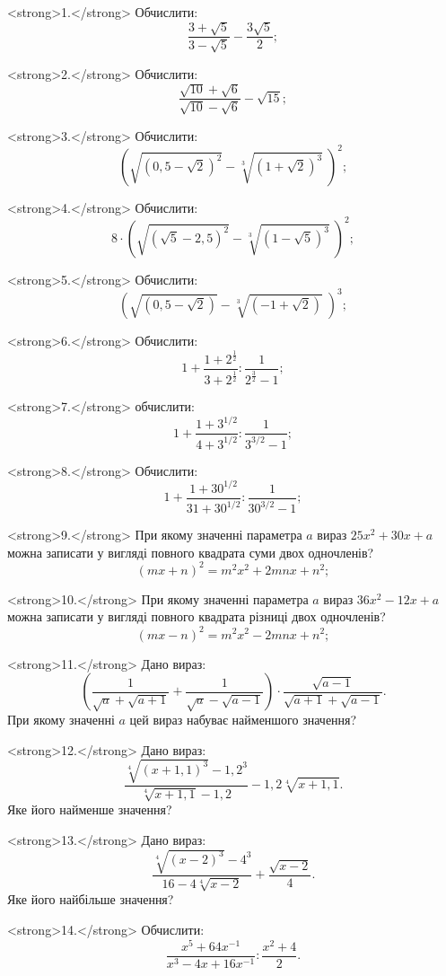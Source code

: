 
<strong>1.</strong> Обчислити:
$$\frac{3+\sqrt{5}}{3-\sqrt{5}}-\frac{3\sqrt{5}}{2};$$

<strong>2.</strong> Обчислити:
$$\frac{\sqrt{10}+\sqrt{6}}{\sqrt{10}-\sqrt{6}} - \sqrt{15};$$

<strong>3.</strong> Обчислити:
$$\left(\sqrt{\left(0,5 - \sqrt{2}\right)^2} - \sqrt[3]{\left(1 + \sqrt{2}\right)^3}\;\right)^2;$$

<strong>4.</strong> Обчислити:
$$8 \cdot \left(\sqrt{\left(\sqrt{5} - 2,5\right)^2} - \sqrt[3]{\left(1 - \sqrt{5}\right)^3}\;\right)^2;$$

<strong>5.</strong> Обчислити:
$$\left(\sqrt{\left(0,5 - \sqrt{2}\right)} - \sqrt[3]{\left(-1 + \sqrt{2}\right)}\;\right)^3;$$

<strong>6.</strong> Обчислити:
$$1 + \frac{1 + 2^\frac{1}{2}}{3 + 2^\frac{1}{2}} : \frac{1}{2^\frac{3}{2} - 1};$$

<strong>7.</strong> обчислити:
$$1 + \frac{1 + 3^{1/2}}{4 + 3^{1/2}} : \frac{1}{3^{3/2} - 1};$$

<strong>8.</strong> Обчислити:
$$1 + \frac{1 + 30^{1/2}}{31 + 30^{1/2}} : \frac{1}{30^{3/2} - 1};$$

<strong>9.</strong> При якому значенні параметра $a$ вираз $25x^2 + 30x + a$ можна записати у вигляді повного квадрата суми двох одночленів?
$$\left(mx + n\right)^2 = m^2x^2 + 2mnx + n^2;$$

<strong>10.</strong> При якому значенні параметра $a$ вираз $36x^2 - 12x + a$ можна записати у вигляді
повного квадрата різниці двох одночленів?
$$\left(mx - n\right)^2 = m^2x^2 - 2mnx + n^2;$$

<strong>11.</strong> Дано вираз:
$$\left(\frac{1}{\sqrt{a} + \sqrt{a + 1}} + \frac{1}{\sqrt{a} - \sqrt{a - 1}}\right) \cdot \frac{\sqrt{a - 1}}{\sqrt{a + 1} + \sqrt{a - 1}}.$$
При якому значенні $a$ цей вираз набуває найменшого значення?

<strong>12.</strong> Дано вираз:
$$\frac{\sqrt[4]{\left(x + 1,1\right)^3} - 1,2^3}{\sqrt[4]{x + 1,1} - 1,2} - 1,2\sqrt[4]{x + 1,1}.$$
Яке його найменше значення?

<strong>13.</strong> Дано вираз:
$$\frac{\sqrt[4]{\left(x - 2\right)^3} - 4^3}{16 - 4\sqrt[4]{x - 2}} + \frac{\sqrt{x - 2}}{4}.$$
Яке його найбільше значення?

<strong>14.</strong> Обчислити:
$$\frac{x^5 + 64x^{-1}}{x^3 - 4x + 16x^{-1}} : \frac{x^2 + 4}{2}.$$
